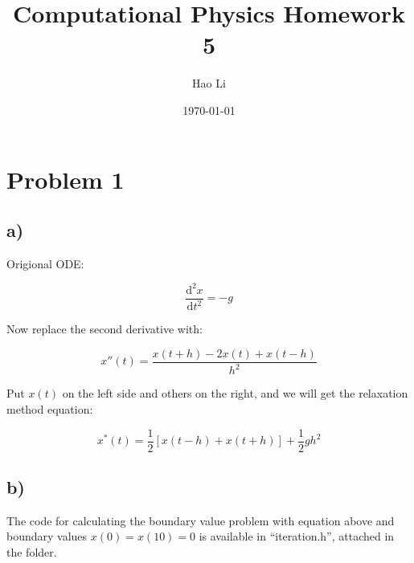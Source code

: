 \documentclass[12pt, graphicx]{article}
\begin{document}
\title{Computational Physics Homework 5}
\author{Hao Li\footnotemark[2]}
\date{\today}


\maketitle

\section*{Problem 1}
\subsection*{a)}
Origional ODE:

\begin{equation}
\frac{\mathrm{d}^2x}{\mathrm{d}t^2}=-g
\end{equation}

Now replace the second derivative with:

\begin{equation}
x''(t)=\frac{x(t+h)-2x(t)+x(t-h)}{h^2}
\end{equation}

Put $x(t)$ on the left side and others on the right, and we will get the relaxation method equation:

\begin{equation}
x^*(t)=\frac{1}{2}[x(t-h)+x(t+h)]+\frac{1}{2}gh^2
\label{eq:rel1}
\end{equation}

\subsection*{b)}
The code for calculating the boundary value problem with equation above and boundary values $x(0)=x(10)=0$ is available in \textquotedblleft iteration.h\textquotedblright, attached in the folder.\par
\end{document}
